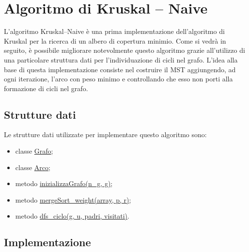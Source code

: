 \section{Algoritmo di Kruskal -- Naive}
\label{AlgoritmoDiKruskalNaive}

L'algoritmo Kruskal--Naive è una prima implementazione dell'algoritmo di Kruskal per la ricerca di un albero di copertura minimio. Come si vedrà in seguito, è possibile migliorare notevolmente questo algoritmo grazie all'utilizzo di una particolare struttura dati per l'individuazione di cicli nel grafo. L'idea alla base di questa implementazione consiste nel costruire il MST aggiungendo, ad ogni iterazione, l'arco con peso minimo e controllando che esso non porti alla formazione di cicli nel grafo. 

\subsection{Strutture dati}
\label{struttureDati2}

Le strutture dati utilizzate per implementare questo algoritmo sono:

\begin{itemize}
    \item classe \hyperlink{subsection.2.2}{Grafo};
    \item classe \hyperlink{subsection.2.1}{Arco};
    \item metodo \hyperlink{inizializzagrafo}{inizializzaGrafo(n\_g, g)};
    \item metodo \hyperlink{mergesort}{mergeSort\_weight(array, p, r)};
    \item metodo \hyperlink{dfsciclo}{dfs\_ciclo(g, u, padri, visitati)}.
\end{itemize}

\newline

\subsection{Implementazione}
\label{implementazione2}

